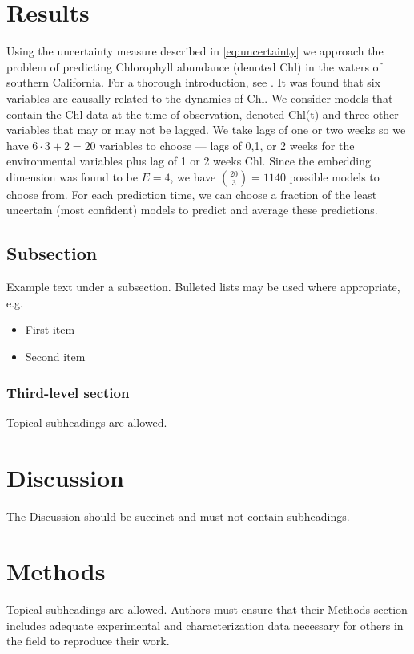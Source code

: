 \documentclass[fleqn,10pt]{wlscirep}
\begin{document}
\section*{Results}
Using the uncertainty measure described in \eqref{eq:uncertainty} we
approach the problem of predicting Chlorophyll abundance (denoted Chl)
in the waters of southern California. For a thorough introduction, see
\cite{that paper}. It was found that six variables are causally
related to the dynamics of Chl. We consider models that contain the
Chl data at the time of observation, denoted Chl(t) and three other
variables that may or may not be lagged. We take lags of one or two
weeks so we have $6 \cdot 3 + 2 = 20$ variables to choose --- lags of
0,1, or 2 weeks for the environmental variables plus lag of 1 or 2
weeks Chl. Since the embedding dimension was found to be $E=4$, we
have $\binom{20}{3} = 1140$ possible models to choose from. For each
prediction time, we can choose a fraction of the least uncertain (most
confident) models to predict and average these predictions.


\subsection*{Subsection}

Example text under a subsection. Bulleted lists may be used where
appropriate, e.g.

\begin{itemize}
\item First item
\item Second item
\end{itemize}

\subsubsection*{Third-level section}
 
Topical subheadings are allowed.

\section*{Discussion}

The Discussion should be succinct and must not contain subheadings.

\section*{Methods}

Topical subheadings are allowed. Authors must ensure that their
Methods section includes adequate experimental and characterization
data necessary for others in the field to reproduce their work.
\end{document}
